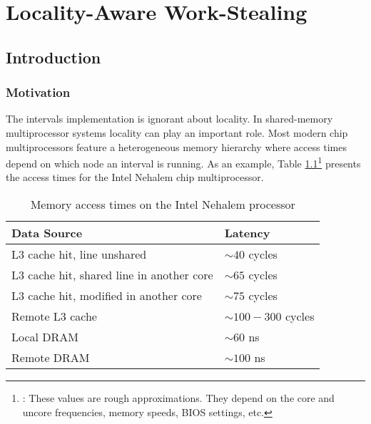 
\part{Locality-Aware Work-Stealing}
\label{part:locality}

\chapter{Introduction}
\label{chap:locality-introduction}

\section{Motivation}
\label{sec:locality-intro-motivation}

The intervals implementation is ignorant about locality. In
shared-memory multiprocessor systems locality can play an important
role. Most modern chip multiprocessors feature a heterogeneous memory
hierarchy where access times depend on which node an interval is
running. As an example, Table
\ref{tab:locality-introduction-memory-access-times}\footnote{\cite{Levinthal2009}:
  These values are rough approximations. They depend on the core and
  uncore frequencies, memory speeds, BIOS settings, etc.} presents the
access times for the Intel Nehalem chip multiprocessor.

\begin{table}[htb]
  \centering
  \begin{tabular}{ll}
    \toprule
    Data Source & Latency \\\midrule
    L3 cache hit, line unshared & $\sim 40$ cycles\\
    L3 cache hit, shared line in another core\hspace{0.5cm} & $\sim 65$ cycles \\
    L3 cache hit, modified in another core & $\sim 75$ cycles \\
    Remote L3 cache & $\sim 100 - 300$ cycles \\
    Local DRAM & $\sim 60$ ns \\
    Remote DRAM & $\sim 100$ ns \\\bottomrule
  \end{tabular}
  \caption[Memory access times on the Intel Nehalem processor]
  {Memory access times on the Intel Nehalem processor}
  \label{tab:locality-introduction-memory-access-times}
\end{table}

